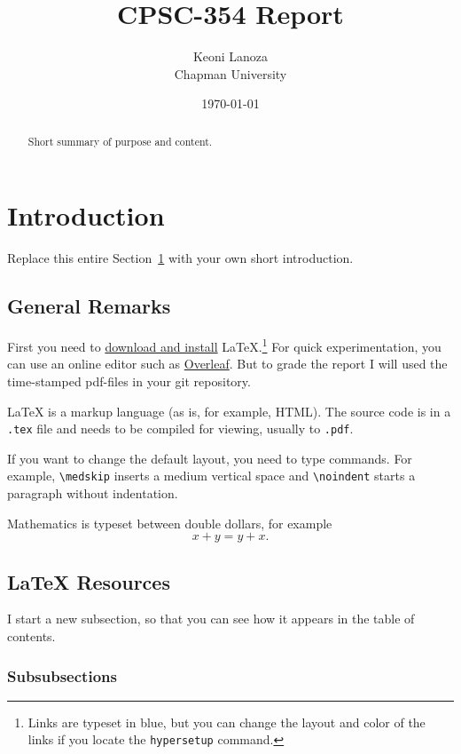 \documentclass{article}
\title{CPSC-354 Report}
\author{Keoni Lanoza  \\ Chapman University}
\date{\today}
\theoremstyle{theorem}
\theoremstyle{definition}
\theoremstyle{remark}
\begin{document}
\maketitle

\begin{abstract}
Short  summary of purpose and content.  
\end{abstract}

\tableofcontents

\section{Introduction}\label{intro}

Replace this entire Section~\ref{intro} with your own short introduction. 

\subsection{General Remarks}

First you need to \href{https://www.latex-project.org/get/}{download and install} LaTeX.\footnote{Links are typeset in blue, but you can change the layout and color of the links if you locate the  \texttt{hypersetup} command.}
%
For quick experimentation, you can use an online editor such as \href{https://www.overleaf.com/learn}{Overleaf}. But to grade the report I will used the time-stamped pdf-files in your git repository.  

 
\medskip\noindent
LaTeX is a markup language (as is, for example, HTML). The source code is in a \verb+.tex+ file and needs to be compiled for viewing, usually to \verb+.pdf+.


\medskip\noindent
If you want to change the default layout, you need to type commands. For example, \verb+\medskip+ inserts a medium vertical space and \verb+\noindent+ starts a paragraph without indentation.
 
\medskip\noindent
Mathematics is typeset between double dollars, for example $$x+y=y+x.$$


\subsection{LaTeX Resources}

I start a new subsection, so that you can see how it appears in the table of contents.

\subsubsection{Subsubsections}
\end{document}
